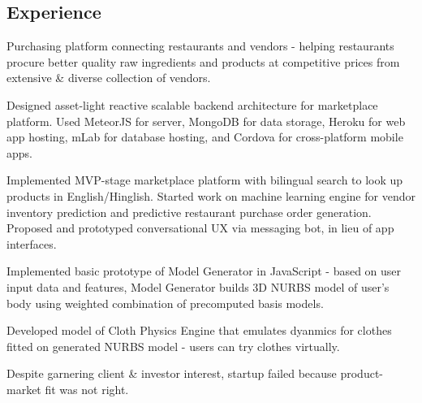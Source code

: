 \documentclass[]{deedy}
\begin{document}
\begin{minipage}[t]{0.72\textwidth}
\begin{flushleft}
%
\section{Experience}
%
\begin{tightemize}
\item Purchasing platform connecting restaurants and vendors - helping restaurants procure better quality raw ingredients and products at competitive prices from extensive \& diverse collection of vendors.
\item Designed asset-light reactive scalable backend architecture for marketplace platform. Used MeteorJS for server, MongoDB for data storage, Heroku for web app hosting, mLab for database hosting, and Cordova for cross-platform mobile apps.
\item Implemented MVP-stage marketplace platform with bilingual search to look up products in English/Hinglish. Started work on machine learning engine for vendor inventory prediction and predictive restaurant purchase order generation. Proposed and prototyped conversational UX via messaging bot, in lieu of app interfaces.
\end{tightemize}
\sectionsep
%
\begin{tightemize}
\item Implemented basic prototype of Model Generator in JavaScript - based on user input data and features, Model Generator builds 3D NURBS model of user's body using weighted combination of precomputed basis models.
\item Developed model of Cloth Physics Engine that emulates dyanmics for clothes fitted on generated NURBS model - users can try clothes virtually.
\item Despite garnering client \& investor interest, startup failed because product-market fit was not right.
\end{tightemize}
\sectionsep
%

\end{flushleft}
\end{minipage}
\end{document}
